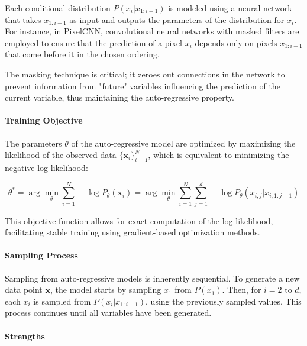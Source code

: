 Each conditional distribution \( P(x_i | x_{1:i-1}) \) is modeled using a neural network that takes \( x_{1:i-1} \) as input and outputs the parameters of the distribution for \( x_i \). For instance, in PixelCNN, convolutional neural networks with masked filters are employed to ensure that the prediction of a pixel \( x_i \) depends only on pixels \( x_{1:i-1} \) that come before it in the chosen ordering.

The masking technique is critical; it zeroes out connections in the network to prevent information from "future" variables influencing the prediction of the current variable, thus maintaining the auto-regressive property.

\paragraph{Training Objective}

The parameters \( \theta \) of the auto-regressive model are optimized by maximizing the likelihood of the observed data \( \{ \mathbf{x}_i \}_{i=1}^N \), which is equivalent to minimizing the negative log-likelihood:

\[
\theta^* = \arg \min_{\theta} \sum_{i=1}^{N} -\log P_{\theta}(\mathbf{x}_i) = \arg \min_{\theta} \sum_{i=1}^{N} \sum_{j=1}^{d} -\log P_{\theta}(x_{i,j} | x_{i,1:j-1})
\]

This objective function allows for exact computation of the log-likelihood, facilitating stable training using gradient-based optimization methods.

\paragraph{Sampling Process}

Sampling from auto-regressive models is inherently sequential. To generate a new data point \( \mathbf{x} \), the model starts by sampling \( x_1 \) from \( P(x_1) \). Then, for \( i = 2 \) to \( d \), each \( x_i \) is sampled from \( P(x_i | x_{1:i-1}) \), using the previously sampled values. This process continues until all variables have been generated.

\paragraph{Strengths}

